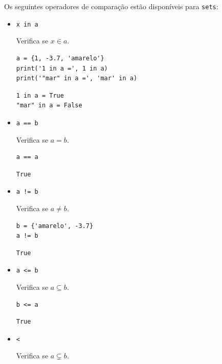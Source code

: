 Os seguintes operadores de comparação estão disponíveis para \texttt{sets}:
\begin{itemize}
\item \lstinline+x in a+ 

  Verifica se $x\in a$.

\begin{lstlisting}[xrightmargin=2.5em]
a = {1, -3.7, 'amarelo'}
print('1 in a =', 1 in a)
print('"mar" in a =', 'mar' in a)
\end{lstlisting}

\begin{verbatim}
1 in a = True
"mar" in a = False  
\end{verbatim}

\item \lstinline+a == b+ 

  Verifica se $a = b$.

\begin{lstlisting}[xrightmargin=2.5em]
a == a
\end{lstlisting}

\begin{verbatim}
True
\end{verbatim}

\item \lstinline+a != b+ 

  Verifica se $a \neq b$.

\begin{lstlisting}[xrightmargin=2.5em]
b = {'amarelo', -3.7}
a != b
\end{lstlisting}

\begin{verbatim}
True
\end{verbatim}
  
\item \lstinline+a <= b+ 

  Verifica se $a \subseteq b$.

\begin{lstlisting}[xrightmargin=2.5em]
b <= a
\end{lstlisting}

\begin{verbatim}
True
\end{verbatim}

\item \lstinline+<+ 

  Verifica se $a\subsetneq b$.


\end{itemize}
